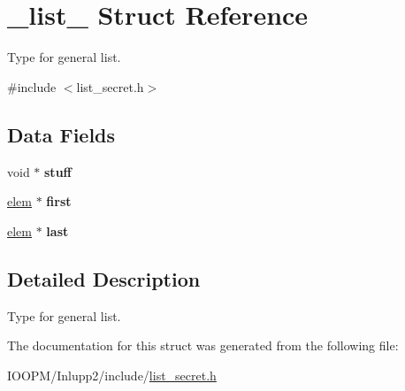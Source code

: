 \hypertarget{struct__list__}{}\section{\+\_\+list\+\_\+ Struct Reference}
\label{struct__list__}


Type for general list.  




{\ttfamily \#include $<$list\+\_\+secret.\+h$>$}

\subsection*{Data Fields}
\begin{DoxyCompactItemize}
\item 
\hypertarget{struct__list___ae3352c2d55b94520c851ad35313ea469}{}void $\ast$ {\bfseries stuff}\label{struct__list___ae3352c2d55b94520c851ad35313ea469}

\item 
\hypertarget{struct__list___a435fcd78a80fab4a2468d355cf37acc4}{}\hyperlink{struct__elem__}{elem} $\ast$ {\bfseries first}\label{struct__list___a435fcd78a80fab4a2468d355cf37acc4}

\item 
\hypertarget{struct__list___acfb162885f2bbfae56c8954c5119e1ac}{}\hyperlink{struct__elem__}{elem} $\ast$ {\bfseries last}\label{struct__list___acfb162885f2bbfae56c8954c5119e1ac}

\end{DoxyCompactItemize}


\subsection{Detailed Description}
Type for general list. 

The documentation for this struct was generated from the following file\+:\begin{DoxyCompactItemize}
\item 
I\+O\+O\+P\+M/\+Inlupp2/include/\hyperlink{list__secret_8h}{list\+\_\+secret.\+h}\end{DoxyCompactItemize}
